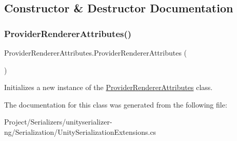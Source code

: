 \subsection{Constructor \& Destructor Documentation}
\mbox{\label{class_provider_renderer_attributes_a0a9188e86d349d258dbd924149d150d4}} 
\subsubsection{\texorpdfstring{Provider\+Renderer\+Attributes()}{ProviderRendererAttributes()}}
{\footnotesize\ttfamily Provider\+Renderer\+Attributes.\+Provider\+Renderer\+Attributes (\begin{DoxyParamCaption}{ }\end{DoxyParamCaption})\hspace{0.3cm}{\ttfamily [inline]}}



Initializes a new instance of the \hyperlink{class_provider_renderer_attributes}{Provider\+Renderer\+Attributes} class. 



The documentation for this class was generated from the following file\+:\begin{DoxyCompactItemize}
\item 
Project/\+Serializers/unityserializer-\/ng/\+Serialization/Unity\+Serialization\+Extensions.\+cs\end{DoxyCompactItemize}
